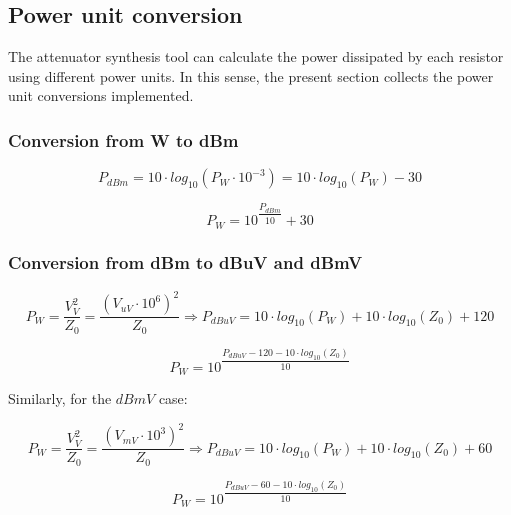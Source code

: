 \clearpage
\subsection{Power unit conversion}

\noindent The attenuator synthesis tool can calculate the power dissipated by each resistor using different power units. In this sense, the present section collects the power unit conversions implemented.

\subsubsection{Conversion from W to dBm}
\begin{equation}
P_{dBm} = 10 \cdot log_{10} (P_{W} \cdot 10^{-3}) = 10 \cdot log_{10} (P_{W}) - 30
\end{equation}

\begin{equation}
P_{W} = 10^{\dfrac{P_{dBm}}{10}} + 30
\end{equation}

\subsubsection{Conversion from dBm to dBuV and dBmV}
\begin{equation}
P_{W} = \dfrac{V_{V}^2}{Z_{0}} = \dfrac{(V_{uV} \cdot 10^{6})^2}{Z_{0}} \Longrightarrow P_{dBuV} = 10 \cdot log_{10} \left( P_{W} \right) + 10 \cdot log_{10} \left( Z_0 \right) +120
\end{equation}

\begin{equation}
P_{W} = 10^{\dfrac{P_{dBuV} - 120 - 10\cdot log_{10} (Z_0)}{10}}
\end{equation}

\nointend Similarly, for the $dBmV$ case:

\begin{equation}
P_{W} = \dfrac{V_{V}^2}{Z_{0}} = \dfrac{(V_{mV} \cdot 10^{3})^2}{Z_{0}} \Longrightarrow P_{dBuV} = 10 \cdot log_{10} \left( P_{W} \right) + 10 \cdot log_{10} \left( Z_0 \right) + 60
\end{equation}

\begin{equation}
P_{W} = 10^{\dfrac{P_{dBuV} - 60 - 10\cdot log_{10} (Z_0)}{10}}
\end{equation}

